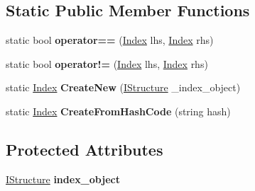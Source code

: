 \subsection*{Static Public Member Functions}
\begin{DoxyCompactItemize}
\item 
\hypertarget{class_dwarf_d_b_1_1_data_structures_1_1_index_aa332f812fd66a7516a1749a6c29a04c6}{
static bool {\bfseries operator==} (\hyperlink{class_dwarf_d_b_1_1_data_structures_1_1_index}{Index} lhs, \hyperlink{class_dwarf_d_b_1_1_data_structures_1_1_index}{Index} rhs)}
\label{class_dwarf_d_b_1_1_data_structures_1_1_index_aa332f812fd66a7516a1749a6c29a04c6}

\item 
\hypertarget{class_dwarf_d_b_1_1_data_structures_1_1_index_a58d657c3d8d9fd9d122d59bf55008495}{
static bool {\bfseries operator!=} (\hyperlink{class_dwarf_d_b_1_1_data_structures_1_1_index}{Index} lhs, \hyperlink{class_dwarf_d_b_1_1_data_structures_1_1_index}{Index} rhs)}
\label{class_dwarf_d_b_1_1_data_structures_1_1_index_a58d657c3d8d9fd9d122d59bf55008495}

\item 
\hypertarget{class_dwarf_d_b_1_1_data_structures_1_1_index_a8e14d93c580e2aadd133afeef416e44a}{
static \hyperlink{class_dwarf_d_b_1_1_data_structures_1_1_index}{Index} {\bfseries CreateNew} (\hyperlink{interface_dwarf_d_b_1_1_data_structures_1_1_i_structure}{IStructure} \_\-index\_\-object)}
\label{class_dwarf_d_b_1_1_data_structures_1_1_index_a8e14d93c580e2aadd133afeef416e44a}

\item 
\hypertarget{class_dwarf_d_b_1_1_data_structures_1_1_index_affa4776e5dd06a160e8a874b0f64d769}{
static \hyperlink{class_dwarf_d_b_1_1_data_structures_1_1_index}{Index} {\bfseries CreateFromHashCode} (string hash)}
\label{class_dwarf_d_b_1_1_data_structures_1_1_index_affa4776e5dd06a160e8a874b0f64d769}

\end{DoxyCompactItemize}
\subsection*{Protected Attributes}
\begin{DoxyCompactItemize}
\item 
\hypertarget{class_dwarf_d_b_1_1_data_structures_1_1_index_a028b92bd2f8012fe81b60d0fbac93044}{
\hyperlink{interface_dwarf_d_b_1_1_data_structures_1_1_i_structure}{IStructure} {\bfseries index\_\-object}}
\label{class_dwarf_d_b_1_1_data_structures_1_1_index_a028b92bd2f8012fe81b60d0fbac93044}

\end{DoxyCompactItemize}
